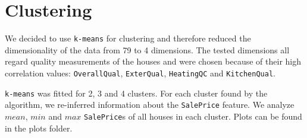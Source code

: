\section{Clustering}

We decided to use \texttt{k-means} for clustering and therefore reduced the dimensionality of the data from 79 to 4 dimensions. The tested dimensions all regard quality measurements of the houses and were chosen because of their high correlation values: \texttt{OverallQual}, \texttt{ExterQual}, \texttt{HeatingQC} and \texttt{KitchenQual}.

\texttt{k-means} was fitted for 2, 3 and 4 clusters. For each cluster found by the algorithm, we re-inferred information about the \texttt{SalePrice} feature. We analyze $mean$, $min$ and $max$ \texttt{SalePrice}s of all houses in each cluster. Plots can be found in the plots folder.